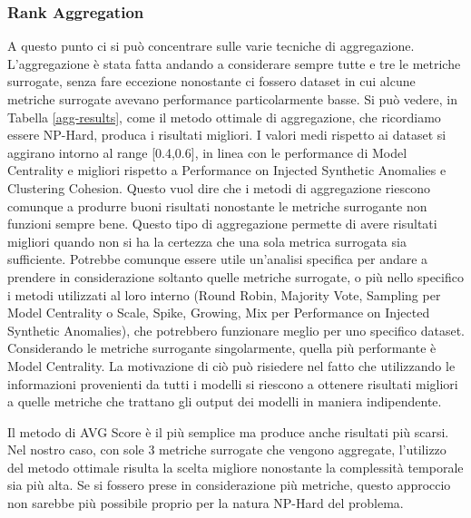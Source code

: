 \newpage
\subsubsection{Rank Aggregation}
A questo punto ci si può concentrare sulle varie tecniche di aggregazione. L'aggregazione è stata fatta andando a considerare sempre tutte e tre le metriche surrogate, senza fare eccezione nonostante ci fossero dataset in cui alcune metriche surrogate avevano performance particolarmente basse. 
Si può vedere, in Tabella \ref{agg-results}, come il metodo ottimale di aggregazione, che ricordiamo essere NP-Hard, produca i risultati migliori. 
I valori medi rispetto ai dataset si aggirano intorno al range [0.4,0.6], in linea con le performance di Model Centrality e migliori rispetto a Performance on Injected Synthetic Anomalies e Clustering Cohesion. Questo vuol dire che i metodi di aggregazione riescono comunque a produrre buoni risultati nonostante le metriche surrogante non funzioni sempre bene. 
Questo tipo di aggregazione permette di avere risultati migliori quando non si ha la certezza che una sola metrica surrogata sia sufficiente. Potrebbe comunque essere utile un'analisi specifica per andare a prendere in considerazione soltanto quelle metriche surrogate, o più nello specifico i metodi utilizzati al loro interno (Round Robin, Majority Vote, Sampling per Model Centrality o Scale, Spike, Growing, Mix per Performance on Injected Synthetic Anomalies), che potrebbero funzionare meglio per uno specifico dataset. 
Considerando le metriche surrogante singolarmente, quella più performante è Model Centrality. La motivazione di ciò può risiedere nel fatto che utilizzando le informazioni provenienti da tutti i modelli si riescono a ottenere risultati migliori a quelle metriche che trattano gli output dei modelli in maniera indipendente.

Il metodo di AVG Score è il più semplice ma produce anche risultati più scarsi. Nel nostro caso, con sole 3 metriche surrogate che vengono aggregate, l'utilizzo del metodo ottimale risulta la scelta migliore nonostante la complessità temporale sia più alta. Se si fossero prese in considerazione più metriche, questo approccio non sarebbe più possibile proprio per la natura NP-Hard del problema.

